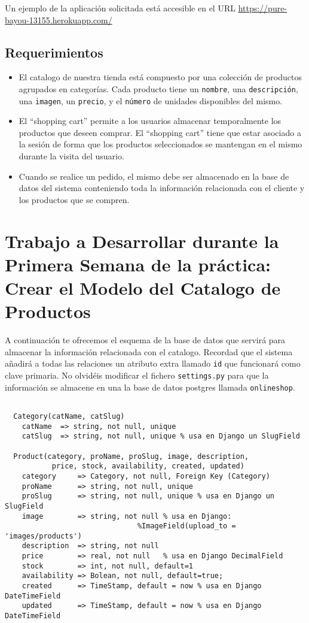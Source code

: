 \documentclass[12pt]{article} %
\newcommand{\herokuurl}[1]{\url{https://pure-bayou-13155.herokuapp.com/#1}}%
\newcommand{\settings}{\texttt{settings.py}}%
\newcommand{\database}{\texttt{onlineshop}}%
\begin{document}
Un ejemplo de la aplicación solicitada está accesible en el URL \herokuurl{}


\subsection{Requerimientos}


\begin{itemize}
    \item El catalogo de nuestra tienda está compuesto por una colección de productos agrupados en categorías. Cada producto tiene un \texttt{nombre}, una \texttt{descripción}, una \texttt{imagen}, un \texttt{precio}, y el \texttt{número} de unidades disponibles del mismo.
    \item El ``shopping cart'' permite a los usuarios almacenar temporalmente los productos que deseen comprar. El ``shopping cart'' tiene que estar asociado a la sesión de forma que 
    los productos seleccionados se mantengan en el mismo durante la visita del usuario.
    \item Cuando se realice un pedido, el mismo debe ser almacenado en la base de datos del sistema conteniendo toda la información relacionada con el cliente y los productos que se compren.


\end{itemize}

\section{Trabajo a Desarrollar durante la Primera Semana de la práctica: Crear el Modelo del Catalogo de Productos}
A continuación te ofrecemos el esquema de la base de datos que servirá para almacenar la información relacionada con el catalogo. Recordad que el sistema añadirá a todas las relaciones un atributo extra llamado \texttt{id} que funcionará como clave primaria. No olvidéis modificar el fichero \settings{} para que la información se almacene en una la base de datos postgres llamada \database. 

\begin{verbatim}
  
  Category(catName, catSlug)
    catName  => string, not null, unique
    catSlug  => string, not null, unique % usa en Django un SlugField

  Product(category, proName, proSlug, image, description, 
           price, stock, availability, created, updated)
    category     => Category, not null, Foreign Key (Category)
    proName      => string, not null, unique
    proSlug      => string, not null, unique % usa en Django un SlugField 
    image        => string, not null % usa en Django: 
                               %ImageField(upload_to = 'images/products')
    description  => string, not null
    price        => real, not null   % usa en Django DecimalField  
    stock        => int, not null, default=1
    availability => Bolean, not null, default=true; 
    created      => TimeStamp, default = now % usa en Django DateTimeField
    updated      => TimeStamp, default = now % usa en Django DateTimeField
      
\end{verbatim}
\end{document}
